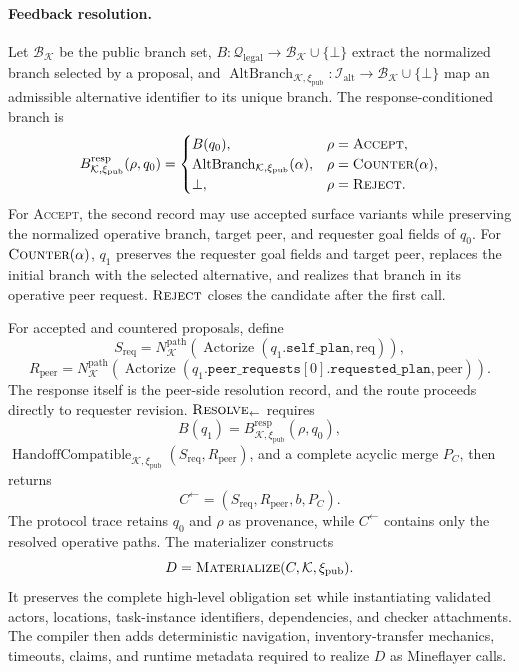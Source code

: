 \documentclass[10pt]{article}
\begin{document}
\paragraph{Feedback resolution.}
Let $\mathcal B_{\mathcal K}$ be the public branch set, $B:\mathcal Q_{\mathrm{legal}}\rightarrow\mathcal B_{\mathcal K}\cup\{\bot\}$ extract the normalized branch selected by a proposal, and $\operatorname{AltBranch}_{\mathcal K,\xi_{\mathrm{pub}}}:\mathcal I_{\mathrm{alt}}\rightarrow\mathcal B_{\mathcal K}\cup\{\bot\}$ map an admissible alternative identifier to its unique branch. The response-conditioned branch is
\[
B_{\mathcal K,\xi_{\mathrm{pub}}}^{\mathrm{resp}}(\rho,q_0)=
\begin{cases}
B(q_0), & \rho=\textsc{Accept},\\
\operatorname{AltBranch}_{\mathcal K,\xi_{\mathrm{pub}}}(\alpha), & \rho=\textsc{Counter}(\alpha),\\
\bot, & \rho=\textsc{Reject}.
\end{cases}
\]
For \textsc{Accept}, the second record may use accepted surface variants while preserving the normalized operative branch, target peer, and requester goal fields of $q_0$. For $\textsc{Counter}(\alpha)$, $q_1$ preserves the requester goal fields and target peer, replaces the initial branch with the selected alternative, and realizes that branch in its operative peer request. $\textsc{Reject}$ closes the candidate after the first call.

For accepted and countered proposals, define
\[
S_{\mathrm{req}}=N_{\mathcal K}^{\mathrm{path}}\!\left(\operatorname{Actorize}(q_1.\mathtt{self\_plan},\mathrm{req})\right),
\]
\[
R_{\mathrm{peer}}=N_{\mathcal K}^{\mathrm{path}}\!\left(\operatorname{Actorize}(q_1.\mathtt{peer\_requests}[0].\mathtt{requested\_plan},\mathrm{peer})\right).
\]
The response itself is the peer-side resolution record, and the route proceeds directly to requester revision. $\textsc{Resolve}_{\leftarrow}$ requires
\[
B(q_1)=B_{\mathcal K,\xi_{\mathrm{pub}}}^{\mathrm{resp}}(\rho,q_0),
\]
$\operatorname{HandoffCompatible}_{\mathcal K,\xi_{\mathrm{pub}}}(S_{\mathrm{req}},R_{\mathrm{peer}})$, and a complete acyclic merge $P_C$, then returns
\[
C^{\leftarrow}=(S_{\mathrm{req}},R_{\mathrm{peer}},b,P_C).
\]
The protocol trace retains $q_0$ and $\rho$ as provenance, while $C^{\leftarrow}$ contains only the resolved operative paths. The materializer constructs
\[
D=\textsc{Materialize}(C,\mathcal K,\xi_{\mathrm{pub}}).
\]
It preserves the complete high-level obligation set while instantiating validated actors, locations, task-instance identifiers, dependencies, and checker attachments. The compiler then adds deterministic navigation, inventory-transfer mechanics, timeouts, claims, and runtime metadata required to realize $D$ as Mineflayer calls.
\end{document}
